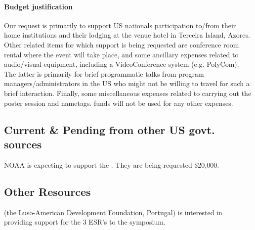 \paragraph{Budget justification} Our request is primarily to support
US nationals participation to/from their home institutions and their
lodging at the venue hotel in Terceira Island, Azores. Other related
items for which support is being requested are conference room rental
where the event will take place, and some ancillary expenses related
to audio/visual equipment, including a VideoConference system
(e.g. PolyCom). The latter is primarily for brief programmatic talks
from program managers/administrators in the US who might not be
willing to travel for such a brief interaction. Finally, some
miscellaneous expenses related to carrying out the poster session and
nametags. \nsf funds will not be used for any other expenses.

\subsection{Current \& Pending from other US govt. sources}

NOAA is expecting to support the \sympe. They are being requested
\$20,000. 

\subsection{Other Resources}

\fla (the Luso-American Development Foundation, Portugal) is
interested in providing support for the 3 ESR's to the symposium.
